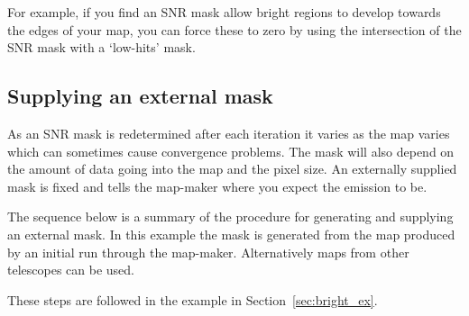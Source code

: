 \documentclass[twoside,11pt]{article}
\newcommand{\htmlref}[2]{#1}
\newcommand{\latexhtml}[2]{#1}
\newcommand{\xlabel}[1]{}
\renewcommand{\_}{\texttt{\symbol{95}}}
\newcommand{\cref}[3]{\latexhtml{#1~\ref{#2}}{\htmlref{#3}{#2}}}
\begin{document}
For example, if you find an SNR mask allow bright regions to develop
towards the edges of your map, you can force these to zero by using
the intersection of the SNR mask with a `low-hits' mask.

\subsection{\xlabel{maskbe}Supplying an external mask}
\label{sec:maskbe}

As an SNR mask is redetermined after each iteration it varies as the
map varies which can sometimes cause convergence problems. The mask
will also depend on the amount of data going into the map and the
pixel size. An externally supplied mask is fixed and tells the
map-maker where you expect the emission to be.

The sequence below is a summary of the procedure for generating and
supplying an external mask. In this example the mask is generated from
the map produced by an initial run through the map-maker.
Alternatively maps from other telescopes can be used.

These steps are followed in the example in \cref{Section}{sec:bright_ex}{Extended galactic sources}.
\end{document}
